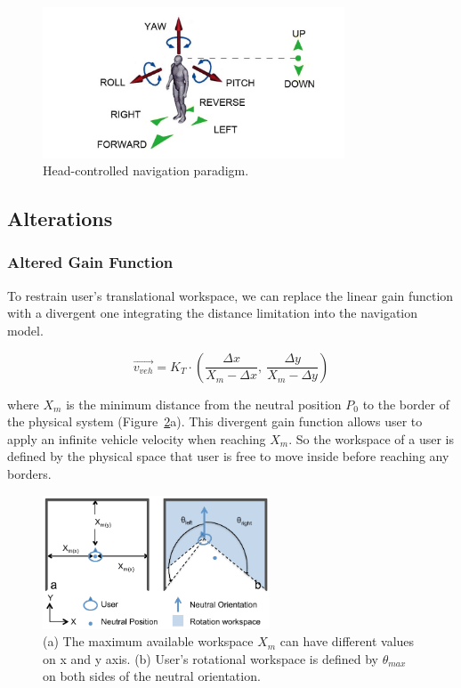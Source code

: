 \begin{figure}[tb]
  \centering
  \includegraphics[width=0.8\textwidth]{figures/3_HCNav}
  \caption{\label{fig:3_hcnav}Head-controlled navigation paradigm.}
\end{figure}

\subsection{Alterations}

\subsubsection{Altered Gain Function}
 To restrain user's translational workspace, we can replace the linear gain function with a divergent one integrating the distance limitation into the navigation model.

\begin{equation}
\overrightarrow{v_{veh}}=K_{T}\cdot \left(\frac{\Delta x}{X_{m}-\Delta x},\:\frac{\Delta y}{X_{m}-\Delta y}\right)
\end{equation}

where $X_{m}$ is the minimum distance from the neutral position $P_{0}$ to the border of the physical system (Figure~\ref{fig:3_workspace_border}a). This divergent gain function allows user to apply an infinite vehicle velocity when reaching $X_{m}$. So the workspace of a user is defined by the physical space that user is free to move inside before reaching any borders.

\begin{figure}[tb]
\begin{center}
\includegraphics[width=0.6\textwidth]{figures/3_workspace_border}
\par\end{center}
\caption{\label{fig:3_workspace_border}(a) The maximum available workspace $X_{m}$ can have different values on x and y axis. (b) User's rotational workspace is defined by $\theta_{max}$ on both sides of the neutral orientation.}
\end{figure}

